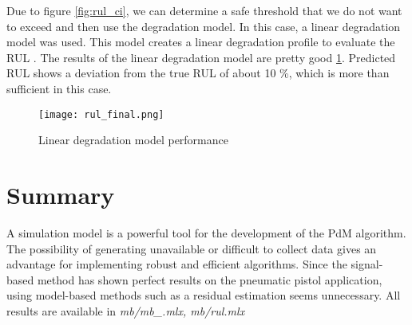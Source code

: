 Due to figure \ref{fig:rul_ci}, we can determine a safe threshold that we
do not want to exceed and then use the degradation model. In this case, a
linear degradation model was used. This model creates a linear degradation
profile to evaluate the RUL \cite{matlab_full}. The results of the linear
degradation model are pretty good \ref{fig:rul_deg_performs}. Predicted RUL
shows a deviation from the true RUL of about 10 \%, which is more than
sufficient in this case.

\begin{figure}[h!]
    \centering
    \texttt{[image: rul\_final.png]}
    \caption{Linear degradation model performance}
    \label{fig:rul_deg_performs}
\end{figure}


\section{Summary}
A simulation model is a powerful tool for the development of the PdM
algorithm. The possibility of generating unavailable or difficult to
collect data gives an advantage for implementing robust and efficient
algorithms. Since the signal-based method has shown perfect results on the
pneumatic pistol application, using model-based methods such as a residual
estimation seems unnecessary. All results are available in
\textit{mb/mb\_.mlx, mb/rul.mlx}
